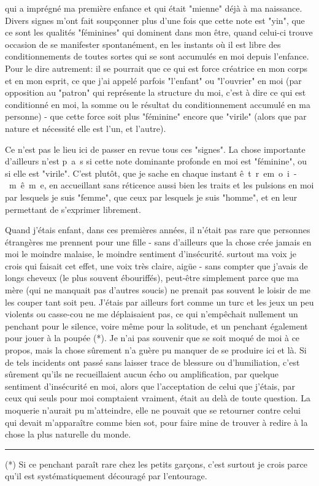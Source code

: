 

qui a imprégné ma première enfance et qui était "mienne" déjà à ma naissance. Divers signes m'ont fait soupçonner plus d'une fois que cette note est "yin", que ce sont les qualités "féminines" qui dominent dans mon être, quand celui-ci trouve occasion de se manifester spontanément, en les instants où il est libre des conditionnements de toutes sortes qui se sont accumulés en moi depuis l'enfance. Pour le dire autrement: il se pourrait que ce qui est force créatrice en mon corps et en mon esprit, ce que j'ai appelé parfois "l'enfant" ou "l'ouvrier" en moi (par opposition au "patron" qui représente la structure du moi, c'est à dire ce qui est conditionné en moi, la somme ou le résultat du conditionnement accumulé en ma personne) - que cette force soit plus "féminine" encore que "virile" (alors que par nature et nécessité elle est l'un, et l'autre).

Ce n'est pas le lieu ici de passer en revue tous ces "signes". La chose importante d'ailleurs n'est \mbox{p a s} si cette note dominante profonde en moi est "féminine", ou si elle est "virile". C'est plutôt, que je sache en chaque instant \mbox{ê t r e}\quad\mbox{m o i - m ê m e}, en accueillant sans réticence aussi bien les traits et les pulsions en moi par lesquels je\unsure{:} suis "femme", que ceux par lesquels je suis "homme", et en leur permettant de s'exprimer librement.

Quand j'étais enfant, dans ces premières années, il n'était pas rare que  personnes étrangères me prennent pour une fille - sans d'ailleurs que la chose crée jamais en moi le moindre malaise, le moindre sentiment d'insécurité.  surtout ma voix je crois qui faisait cet effet, une voix très claire, aigüe - sans compter que j'avais de longs cheveux (le plus souvent ébouriffés), peut-être simplement parce que ma mère (qui ne manquait pas d'autres soucis) ne prenait pas souvent le loisir de me les couper tant soit peu. J'étais par ailleurs fort comme un turc et les jeux un peu violents ou casse-cou ne me déplaisaient pas, ce qui n'empêchait nullement un penchant pour le silence, voire même pour la solitude, et un penchant également pour jouer à la poupée (*). Je n'ai pas souvenir que  se soit moqué de moi à ce propos, mais la chose sûrement n'a guère pu manquer de se produire ici et là. Si de tels incidents ont passé sans laisser trace de blessure ou d'humiliation, c'est sûrement qu'ils ne recueillaient aucun écho ou amplification, par quelque sentiment d'insécurité en moi, alors que l'acceptation de celui que j'étais, par ceux qui seuls pour moi comptaient vraiment, était au delà de toute question. La moquerie n'aurait pu m'atteindre, elle ne pouvait que se retourner contre celui qui devait m'apparaître comme bien sot, pour faire mine de trouver à redire à la chose la plus naturelle du monde.

\noindent\rule{5em}{0.4pt}\par
(*) Si ce penchant paraît rare chez les petits garçons, c'est surtout je crois parce qu'il est systématiquement découragé par l'entourage.

